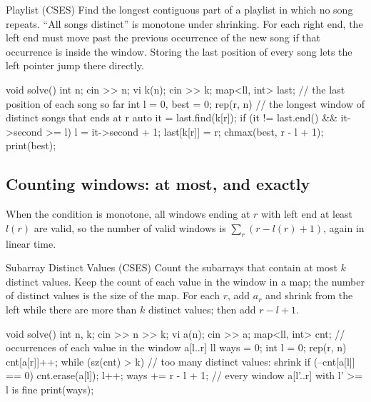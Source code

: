 
\begin{problem}{Playlist (CSES)}
Find the longest contiguous part of a playlist in which no song repeats.
\solution ``All songs distinct'' is monotone under shrinking. For each right end, the left end must move past the previous
occurrence of the new song if that occurrence is inside the window. Storing the last position of every song lets the left
pointer jump there directly.
\end{problem}

\begin{code}
void solve() {
    int n;
    cin >> n;
    vi k(n);
    cin >> k;
    map<ll, int> last;  // the last position of each song so far
    int l = 0, best = 0;
    rep(r, n) {  // the longest window of distinct songs that ends at r
        auto it = last.find(k[r]);
        if (it != last.end() && it->second >= l) l = it->second + 1;
        last[k[r]] = r;
        chmax(best, r - l + 1);
    }
    print(best);
}
\end{code}

\subsection{Counting windows: at most, and exactly}

When the condition is monotone, all windows ending at $r$ with left end at least $l(r)$ are valid, so the number of valid
windows is $\sum_r (r - l(r) + 1)$, again in linear time.

\begin{problem}{Subarray Distinct Values (CSES)}
Count the subarrays that contain at most $k$ distinct values.
\solution Keep the count of each value in the window in a map; the number of distinct values is the size of the map. For
each $r$, add $a_r$ and shrink from the left while there are more than $k$ distinct values; then add $r - l + 1$.
\end{problem}

\begin{code}
void solve() {
    int n, k;
    cin >> n >> k;
    vi a(n);
    cin >> a;
    map<ll, int> cnt;  // occurrences of each value in the window a[l..r]
    ll ways = 0;
    int l = 0;
    rep(r, n) {
        cnt[a[r]]++;
        while (sz(cnt) > k) {  // too many distinct values: shrink
            if (--cnt[a[l]] == 0) cnt.erase(a[l]);
            l++;
        }
        ways += r - l + 1;  // every window a[l'..r] with l' >= l is fine
    }
    print(ways);
}
\end{code}

